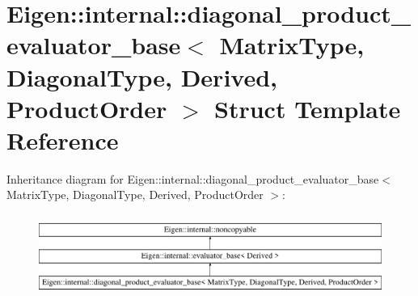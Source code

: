 \hypertarget{struct_eigen_1_1internal_1_1diagonal__product__evaluator__base}{}\section{Eigen\+::internal\+::diagonal\+\_\+product\+\_\+evaluator\+\_\+base$<$ Matrix\+Type, Diagonal\+Type, Derived, Product\+Order $>$ Struct Template Reference}
\label{struct_eigen_1_1internal_1_1diagonal__product__evaluator__base}
Inheritance diagram for Eigen\+::internal\+::diagonal\+\_\+product\+\_\+evaluator\+\_\+base$<$ Matrix\+Type, Diagonal\+Type, Derived, Product\+Order $>$\+:\begin{figure}[H]
\begin{center}
\leavevmode
\includegraphics[height=2.740620cm]{struct_eigen_1_1internal_1_1diagonal__product__evaluator__base}
\end{center}
\end{figure}
